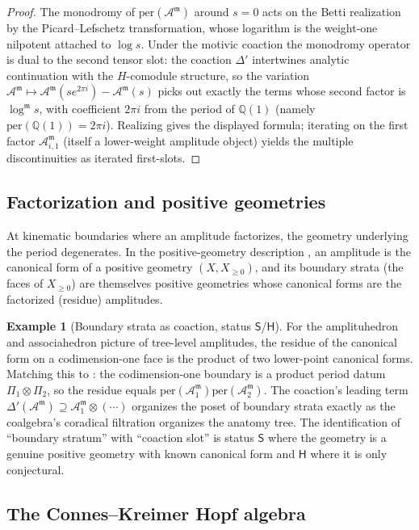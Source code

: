 \documentclass[12pt]{article}
\theoremstyle{definition}
\newtheorem{example}[theorem]{Example}
\theoremstyle{remark}
\newcommand{\per}{\mathrm{per}}
\newcommand{\Amm}{\mathcal{A}^{\mathfrak{m}}}
\newcommand{\coA}{\Delta}
\newcommand{\Qbb}{\mathbb{Q}}
\newcommand{\Slab}{\ensuremath{\mathsf{S}}}
\newcommand{\Hlab}{\ensuremath{\mathsf{H}}}
\begin{document}
\begin{proof}
The monodromy of $\per(\Amm)$ around $s=0$ acts on the Betti realization by the Picard--Lefschetz
transformation, whose logarithm is the weight-one nilpotent attached to $\log s$. Under the
motivic coaction the monodromy operator is dual to the second tensor slot: the coaction
$\coA'$ intertwines analytic continuation with the $H$-comodule structure, so the variation
$\Amm\mapsto\Amm(s e^{2\pi i})-\Amm(s)$ picks out exactly the terms whose second factor is
$\log^{\mathfrak m}s$, with coefficient $2\pi i$ from the period of $\Qbb(1)$
(namely $\per(\Qbb(1))=2\pi i$). Realizing gives the displayed formula; iterating on the
first factor $\Amm_{i,1}$ (itself a lower-weight amplitude object) yields the multiple
discontinuities as iterated first-slots.
\end{proof}

\subsection{Factorization and positive geometries}

At kinematic boundaries where an amplitude factorizes, the geometry underlying the period
degenerates. In the positive-geometry description \cite{ArkaniHamed}, an amplitude is the
canonical form of a positive geometry $(X,X_{\ge 0})$, and its boundary strata (the faces
of $X_{\ge 0}$) are themselves positive geometries whose canonical forms are the
factorized (residue) amplitudes.

\begin{example}[Boundary strata as coaction, status \Slab/\Hlab]
\label{ex:posgeom}
For the amplituhedron and associahedron picture of tree-level amplitudes, the residue of the
canonical form on a codimension-one face is the product of two lower-point canonical forms.
Matching this to : the codimension-one boundary is a product period datum
$\Pi_1\otimes\Pi_2$, so the residue equals $\per(\Amm_1)\per(\Amm_2)$. The coaction's leading
term $\coA'(\Amm)\supseteq\Amm_1\otimes(\cdots)$ organizes the poset of boundary strata
exactly as the coalgebra's coradical filtration organizes the anatomy tree. The identification
of ``boundary stratum'' with ``coaction slot'' is status \Slab{} where the geometry is a
genuine positive geometry with known canonical form and \Hlab{} where it is only conjectural.
\end{example}

\subsection{The Connes--Kreimer Hopf algebra}
\end{document}
